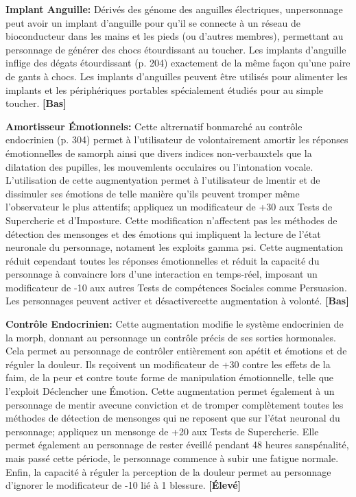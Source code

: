 \textbf{Implant Anguille:} Dérivés des génome des anguilles électriques, unpersonnage peut avoir un implant d'anguille pour qu'il se connecte à un réseau de bioconducteur dans les mains et les pieds (ou d'autres membres), permettant au personnage de générer des chocs étourdissant au toucher. Les implants d'anguille inflige des dégats étourdissant (p. 204) exactement de la même façon qu'une paire de gants à chocs. Les implants d'anguilles peuvent être utilisés pour alimenter les implants et les périphériques portables spécialement étudiés pour au simple toucher. \textbf{[Bas]} 

\textbf{Amortisseur Émotionnels:} Cette altrernatif bonmarché au contrôle endocrinien (p. 304) permet à l'utilisateur de volontairement amortir les réponses émotionnelles de samorph ainsi que divers indices non-verbauxtels que la dilatation des pupilles, les mouvemlents occulaires ou l'intonation vocale. L'utilisation de cette augmentyation permet à l'utilisateur de lmentir et de dissimuler ses émotions de telle manière qu'ils peuvent tromper même l'observateur le plus attentifs; appliquez un modificateur de +30 aux Tests de Supercherie et d'Imposture. Cette modification n'affectent pas les méthodes de détection des mensonges et des émotions qui impliquent la lecture de l'état neuronale du personnage, notament les exploits gamma psi. Cette augmentation réduit cependant toutes les réponses émotionnelles et réduit la capacité du personnage à convaincre lors d'une interaction en temps-réel, imposant un modificateur de -10 aux autres Tests de compétences Sociales comme Persuasion. Les personnages peuvent activer et désactivercette augmentation à volonté. \textbf{[Bas]} 

\textbf{Contrôle Endocrinien:} Cette augmentation modifie le système endocrinien de la morph, donnant au personnage un contrôle précis de ses sorties hormonales. Cela permet au personnage de contrôler entièrement son apétit et émotions et de réguler la douleur. Ils reçoivent un modificateur de +30 contre les effets de la faim, de la peur et contre toute forme de manipulation émotionnelle, telle que l'exploit Déclencher une Émotion. Cette augmentation permet également à un personnage de mentir avecune conviction et de tromper complètement toutes les méthodes de détection de mensonges qui ne reposent que sur l'état neuronal du personnage; appliquez un mensonge de +20 aux Tests de Supercherie. Elle permet également au personnage de rester éveillé pendant 48 heures sanspénalité, mais passé cette période, le personnage commence à subir une fatigue normale. Enfin, la capacité à réguler la perception de la douleur permet au personnage d'ignorer le modificateur de -10 lié à 1 blessure. \textbf{[Élevé]} 

